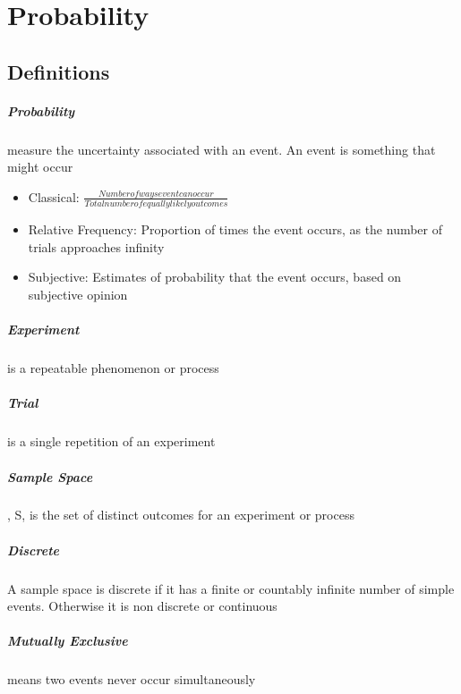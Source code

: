 \chapter{Probability}
  \section{Definitions}
    \paragraph{Probability} measure the uncertainty associated with an event.
    An event is something that might occur
    \begin{itemize}
      \item Classical: $\frac{Number of ways event can occur}{Total number of
      equally likely outcomes}$
      \item Relative Frequency: Proportion of times the event occurs, as the
      number of trials approaches infinity
      \item Subjective: Estimates of probability that the event occurs, based
      on subjective opinion
    \end{itemize}

    \paragraph{Experiment} is a repeatable phenomenon or process
    \paragraph{Trial} is a single repetition of an experiment
    \paragraph{Sample Space}, S, is the set of distinct outcomes for an
    experiment or process
    \paragraph{Discrete} A sample space is discrete if it has a finite or
    countably infinite number of simple events. Otherwise it is non discrete or
    continuous

    \paragraph{Mutually Exclusive} means two events never occur simultaneously

